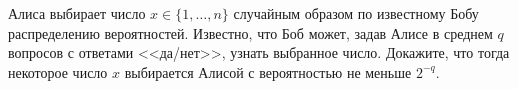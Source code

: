 Алиса выбирает число $x \in \{1, \dots, n\}$ случайным образом по известному Бобу распределению
вероятностей. Известно, что Боб может, задав Алисе в среднем $q$ вопросов с ответами <<да/нет>>, узнать
выбранное число. Докажите, что тогда некоторое число $x$ выбирается Алисой с вероятностью не меньше $2^{-q}$.